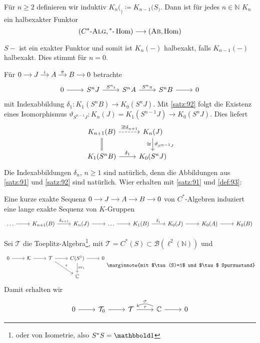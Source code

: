 \begin{definitionP}[label=def:93]
	Für $n \ge 2$ definieren wir induktiv $K_n(_) \coloneqq K_{n-1}(S_)$.
	Dann ist für jedes $n \in \mathbb{N}$ $K_n$ ein halbexakter Funktor
	\[
		\enbrace*{\CSTAR, {^*}\text{-}\Hom} \longrightarrow \enbrace*{\AB, \Hom}
	\]
\end{definitionP}
\begin{beweis}
	$S-$ ist ein exakter Funktor und somit ist $K_n(-)$ halbexakt, falls $K_{n-1}(-)$ halbexakt.
	Dies stimmt für $n=0$.
\end{beweis}

Für \(
	\begin{tikzcd}[cramped,sep=small]
		0 \rar & J \rar["\iota"] & A \rar["\pi"] & B \rar & 0
	\end{tikzcd}
\) betrachte 
\[
	\begin{tikzcd}
		0 \rar & S^n J \rar["S^n \iota"] & S^n A \rar["S^n \pi"] & S^n B \rar & 0
	\end{tikzcd}
\]
mit Indexabbildung $\delta_1 \colon K_1(S^n B) \to K_0(S^n J)$.
Mit \autoref{satz:92} folgt die Existenz eines Isomorphismus $\vartheta_{S^{n-1}J} \colon K_n(J) = K_1(S^{n-1}J) \to K_0(S^n J)$.
Dies liefert
\[
	\begin{tikzcd}
		K_{n+1}(B) \rar[dashed,"\exists! \delta_{n+1}"] & K_n(J) \dar["\cong"',"\vartheta_{S^{n-1}J}"] \\
		K_1(S^n B) \uar[equal] \rar["\delta_1"] & K_0(S^n J)
	\end{tikzcd}
\]
Die Indexabbildungen $\delta_n$, $n \ge 1$ sind natürlich, denn die Abbildungen aus \autoref{satz:91} und \autoref{satz:92} sind natürlich.
Wier erhalten mit \autoref{satz:91} und \autoref{def:93}:

\begin{proposition}
	Eine kurze exakte Sequenz \(
		\begin{tikzcd}[cramped,sep=small]
			0 \rar & J \rar & A \rar & B \rar & 0
		\end{tikzcd}
	\)
	von $C^*$-Algebren induziert eine lange exakte Sequenz von $K$-Gruppen
	\[
		\begin{tikzcd}
			\ldots \rar & K_{n+1}(B) \rar["\delta_{n+1}"] & K_n(J) \rar & \ldots \rar & K_1(B) \rar["\delta_1"] & K_0(J) \rar & K_0(A) \rar & K_0(B)
		\end{tikzcd}
	\]
\end{proposition}

Sei $\mathcal{T}$ die Toeplitz-Algebra\footnote{oder von Isometrie, also $S^*S=\ind$}, mit $\mathcal{T} = C^*(S) \subset \mathcal{B}(\ell^2(\mathbb{N}))$ und 
\[
	\begin{tikzcd}
		0 \rar & \mathcal{K} \rar & \mathcal{T} \rar \drar["\tau"] & C(S^1) \dar["\ev_1"] \rar & 0 \\
		& & & \mathbb{C}
	\end{tikzcd}\marginnote{mit $\tau(S)=1$ und $\tau$ Spurzustand}
\]
Damit erhalten wir 
\[
	\begin{tikzcd}
		0 \rar & \mathcal{T}_0 \rar & \mathcal{T} \rar["\tau"] & \mathbb{C} \lar[bend right,"\sigma"'] \rar & 0
	\end{tikzcd}
\]

